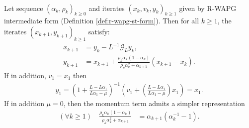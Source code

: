 \documentclass[12pt]{article}
\begin{document}
        \begin{proposition}\label{prop:r-wapg-momentum-repr}
            \;\\
            Let sequence $(\alpha_k, \rho_k)_{k \ge 0}$ and iterates $(x_k, v_k, y_k)_{k\ge 1}$ given by R-WAPG intermediate form (Definition \ref{def:r-wapg-st-form}). 
            Then for all $k \ge 1$, the iterates $(x_{k + 1}, y_{k + 1})_{k \ge 1}$ satisfy: 
            \begin{align*}
                x_{k + 1} &= y_k - L^{-1}\mathcal G_Ly_k, 
                \\
                y_{k + 1} &= 
                x_{k + 1} + 
                \frac{\rho_k\alpha_k(1 - \alpha_k)}
                {\rho_k\alpha_k^2 + \alpha_{k + 1}}(x_{k + 1} - x_k). 
            \end{align*}
            If in addition, $v_1 = x_1$ then 
            \begin{align*}
                y_1 = \left(
                    1 + \frac{L - L \alpha_1}{L\alpha_1 - \mu}
                \right)^{-1}\left(
                    v_1 + \left(
                        \frac{L - L \alpha_1}{L \alpha_1 - \mu}
                    \right)x_1
                \right) = x_1. 
            \end{align*}
            If in addition $\mu = 0$, then the momentum term admits a simpler representation 
            \begin{align*}
                (\forall k \ge 1) \quad 
                \frac{\rho_k\alpha_k(1 - \alpha_k)}{\rho_k\alpha_k^2 + \alpha_{k + 1}}
                & = \alpha_{k + 1}(\alpha_k^{-1} - 1). 
            \end{align*}
        \end{proposition}
\end{document}
